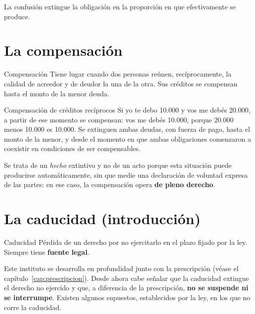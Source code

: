 \documentclass[12pt,oneside]{book}
\begin{document}
La confusión extingue la obligación en la proporción en que efectivamente se produce.

\section{La compensación}

\begin{definition}{Compensación}
Tiene lugar cuando dos personas reúnen, recíprocamente, la calidad de acreedor y de deudor la una de la otra. Sus créditos se compensan hasta el monto de la menor deuda.
\end{definition}

\begin{example}{Compensación de créditos recíprocos}
Si yo te debo 10.000 y vos me debés 20.000, a partir de ese momento se compensan: vos me debés 10.000, porque 20.000 menos 10.000 es 10.000. Se extinguen ambas deudas, con fuerza de pago, hasta el monto de la menor, y desde el momento en que ambas obligaciones comenzaron a coexistir en condiciones de ser compensables.
\end{example}

Se trata de un \textit{hecho} extintivo y no de un acto porque esta situación puede producirse automáticamente, sin que medie una declaración de voluntad expresa de las partes: en ese caso, la compensación opera \textbf{de pleno derecho}.

\section{La caducidad (introducción)}

\begin{definition}{Caducidad}
Pérdida de un derecho por no ejercitarlo en el plazo fijado por la ley. Siempre tiene \textbf{fuente legal}.
\end{definition}

Este instituto se desarrolla en profundidad junto con la prescripción (véase el capítulo~\ref{cap:prescripcion}). Desde ahora cabe señalar que la caducidad extingue el derecho no ejercido y que, a diferencia de la prescripción, \textbf{no se suspende ni se interrumpe}. Existen algunos supuestos, establecidos por la ley, en los que no corre la caducidad.
\end{document}
